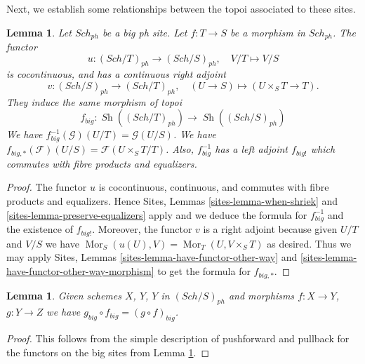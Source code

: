 \documentclass{stacks-project}
\theoremstyle{plain}
\newtheorem{lemma}[subsection]{Lemma}
\theoremstyle{definition}
\theoremstyle{remark}
\numberwithin{equation}{subsection}
\def\Sch{\mathit{Sch}}
\def\Mor{\mathop{\mathrm{Mor}}\nolimits}
\def\Sh{\mathop{\mathit{Sh}}\nolimits}
\begin{document}
\noindent
Next, we establish some relationships between the topoi
associated to these sites.

\begin{lemma}
\label{lemma-morphism-big-ph}
Let $\Sch_{ph}$ be a big ph site.
Let $f : T \to S$ be a morphism in $\Sch_{ph}$.
The functor
$$
u : (\Sch/T)_{ph} \longrightarrow (\Sch/S)_{ph},
\quad
V/T \longmapsto V/S
$$
is cocontinuous, and has a continuous right adjoint
$$
v : (\Sch/S)_{ph} \longrightarrow (\Sch/T)_{ph},
\quad
(U \to S) \longmapsto (U \times_S T \to T).
$$
They induce the same morphism of topoi
$$
f_{big} :
\Sh((\Sch/T)_{ph})
\longrightarrow
\Sh((\Sch/S)_{ph})
$$
We have $f_{big}^{-1}(\mathcal{G})(U/T) = \mathcal{G}(U/S)$.
We have $f_{big, *}(\mathcal{F})(U/S) = \mathcal{F}(U \times_S T/T)$.
Also, $f_{big}^{-1}$ has a left adjoint $f_{big!}$ which commutes with
fibre products and equalizers.
\end{lemma}

\begin{proof}
The functor $u$ is cocontinuous, continuous, and commutes with fibre products
and equalizers. Hence
Sites, Lemmas \ref{sites-lemma-when-shriek} and
\ref{sites-lemma-preserve-equalizers}
apply and we deduce the formula
for $f_{big}^{-1}$ and the existence of $f_{big!}$. Moreover,
the functor $v$ is a right adjoint because given $U/T$ and $V/S$
we have $\Mor_S(u(U), V) = \Mor_T(U, V \times_S T)$
as desired. Thus we may apply
Sites, Lemmas \ref{sites-lemma-have-functor-other-way} and
\ref{sites-lemma-have-functor-other-way-morphism} to get the
formula for $f_{big, *}$.
\end{proof}

\begin{lemma}
\label{lemma-composition-ph}
Given schemes $X$, $Y$, $Y$ in $(\Sch/S)_{ph}$
and morphisms $f : X \to Y$, $g : Y \to Z$ we have
$g_{big} \circ f_{big} = (g \circ f)_{big}$.
\end{lemma}

\begin{proof}
This follows from the simple description of pushforward
and pullback for the functors on the big sites from
Lemma \ref{lemma-morphism-big-ph}.
\end{proof}
\end{document}
